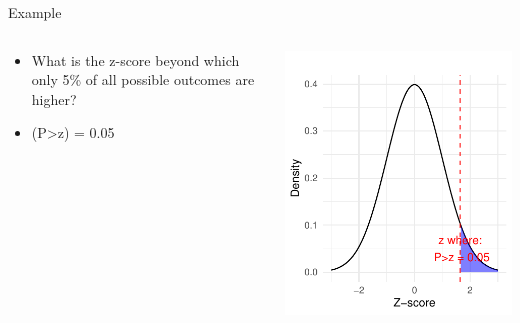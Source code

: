 \documentclass[
  ignorenonframetext,
]{beamer}
\providecommand{\tightlist}{%
  \setlength{\itemsep}{0pt}\setlength{\parskip}{0pt}}
\begin{document}
\begin{frame}{Example}
\label{example-3}
\begin{columns}[T]
\begin{column}{0.5\textwidth}
\vspace{1cm}

\begin{itemize}
\tightlist
\item
  What is the z-score beyond which only 5\% of all possible outcomes are
  higher?
\end{itemize}

\begin{itemize}
\tightlist
\item
  (P\textgreater z) = 0.05
\end{itemize}
\end{column}

\begin{column}{0.5\textwidth}
\vspace{1cm}

\includegraphics{M5-Hypothesis-Testing,-Probability-and-Distribution_files/figure-beamer/unnamed-chunk-19-1.pdf}
\end{column}
\end{columns}
\end{frame}
\end{document}
